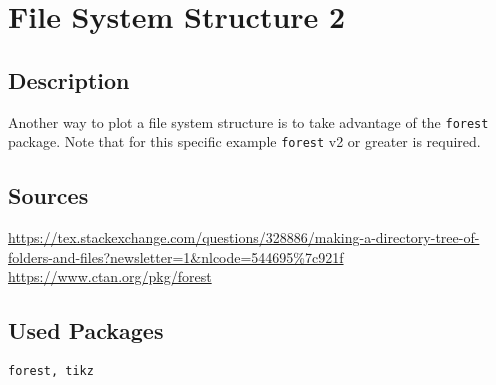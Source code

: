 \documentclass{article}
\begin{document}
\section*{File System Structure 2}

\subsection*{Description}
Another way to plot a file system structure is to take advantage of the \texttt{forest} package. Note that for this specific example \texttt{forest} v2 or greater is required.

\subsection*{Sources}
\url{https://tex.stackexchange.com/questions/328886/making-a-directory-tree-of-folders-and-files?newsletter=1&nlcode=544695%7c921f}\\
\url{https://www.ctan.org/pkg/forest}

\subsection*{Used Packages}
\verb|forest, tikz|
\end{document}
